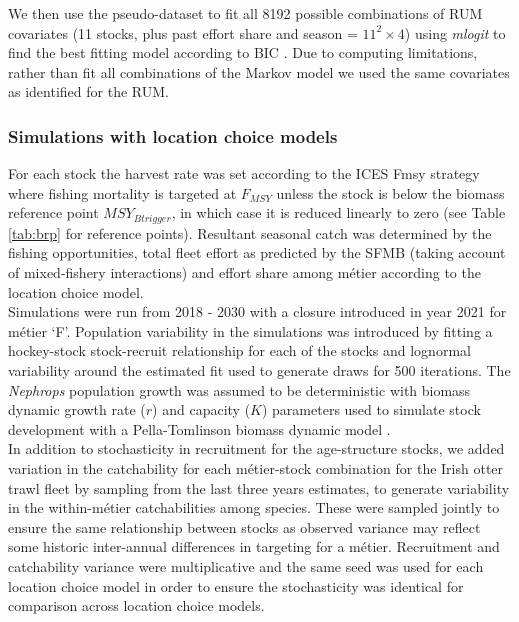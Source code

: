 \documentclass[12pt, halfline, a4paper]{ouparticle}
\begin{document}
We then use the pseudo-dataset to fit all 8192 possible combinations of RUM
covariates (11 stocks, plus past effort share and season = $11^2 \times 4$)
using \textit{mlogit} to find the best fitting model according to BIC
\citep{Schwarz1978}. Due to computing limitations, rather than fit all
combinations of the Markov model we used the same covariates as identified for
the RUM.

\subsubsection{Simulations with location choice models}

For each stock the harvest rate was set according to the ICES Fmsy strategy
where fishing mortality is targeted at $F_{MSY}$ unless the stock is below the
biomass reference point $MSY_{Btrigger}$, in which case it is reduced linearly
to zero (see Table \ref{tab:brp} for reference points). Resultant seasonal
catch was determined by the fishing opportunities, total fleet effort as
predicted by the SFMB (taking account of mixed-fishery interactions) and effort
share among métier according to the location choice model. \\

Simulations were run from 2018 - 2030 with a closure introduced in year 2021
for métier `F'. Population variability in the simulations was introduced by
fitting a hockey-stock stock-recruit relationship for each of the stocks and
lognormal variability around the estimated fit used to generate draws for 500
iterations.  The \textit{Nephrops} population growth was assumed to be
deterministic with biomass dynamic growth rate ($r$) and capacity ($K$)
parameters used to simulate stock development with a Pella-Tomlinson biomass
dynamic model \citep{Pella1969}. \\

In addition to stochasticity in recruitment for the age-structure stocks, we
added variation in the catchability for each métier-stock combination for the
Irish otter trawl fleet by sampling from the last three years estimates, to
generate variability in the within-métier catchabilities among species. These
were sampled jointly to ensure the same relationship between stocks as observed
variance may reflect some historic inter-annual differences in targeting for a
métier.  Recruitment and catchability variance were multiplicative and the same
seed was used for each location choice model in order to ensure the
stochasticity was identical for comparison across location choice models.
\end{document}
